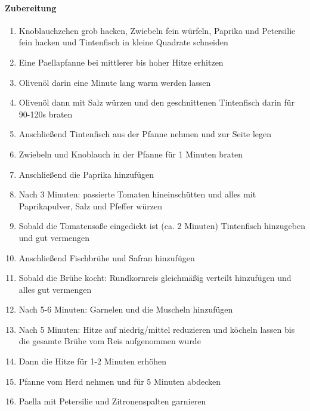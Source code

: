 \paragraph{Zubereitung}
\begin{enumerate}[noitemsep]
	\item Knoblauchzehen grob hacken, Zwiebeln fein würfeln, Paprika und Petersilie fein hacken und Tintenfisch in kleine Quadrate schneiden
	\item Eine Paellapfanne bei mittlerer bis hoher Hitze erhitzen 
	\item Olivenöl darin eine Minute lang warm werden lassen
	\item Olivenöl dann mit Salz würzen und den geschnittenen Tintenfisch darin für 90-120s braten
	\item Anschließend Tintenfisch aus der Pfanne nehmen und zur Seite legen
	\item Zwiebeln und Knoblauch in der Pfanne für 1 Minuten braten 
	\item Anschließend die Paprika hinzufügen
	\item Nach 3 Minuten: passierte Tomaten hineinschütten und alles mit Paprikapulver, Salz und Pfeffer würzen
	\item Sobald die Tomatensoße eingedickt ist (ca. 2 Minuten) Tintenfisch hinzugeben und gut vermengen
	\item Anschließend Fischbrühe und Safran hinzufügen
	\item Sobald die Brühe kocht: Rundkornreis gleichmäßig verteilt hinzufügen und alles gut vermengen
	\item Nach 5-6 Minuten: Garnelen und die Muscheln hinzufügen
	\item Nach 5 Minuten: Hitze auf niedrig/mittel reduzieren und köcheln lassen bis die gesamte Brühe vom Reis aufgenommen wurde
	\item Dann die Hitze für 1-2 Minuten erhöhen
	\item Pfanne vom Herd nehmen und für 5 Minuten abdecken
	\item Paella mit Petersilie und Zitronenspalten garnieren
\end{enumerate}
